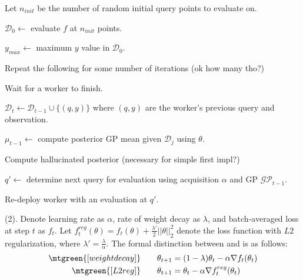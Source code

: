 \documentclass[11pt]{article}
\begin{document}
\begin{algorithm}
	Let $n_{init}$ be the number of random initial query points to evaluate on. 
	
	\begin{compactitem}
		\item $\mathcal{D}_0 \leftarrow$ evaluate $f$ at $n_{init}$ points.
		
		\item $y_{max} \leftarrow$ maximum $y$ value in $\mathcal{D}_0$. 
		
		\item Repeat the following for some number of iterations (ok how many tho?)
		\begin{compactitem}
			\item Wait for a worker to finish. 
			
			\item $\mathcal{D}_t \leftarrow \mathcal{D}_{t-1} \cup \{(q, y)\}$ where $(q, y)$ are the worker's previous query and observation. 
			
			\item $\mu_{t-1} \leftarrow $ compute posterior GP mean given $\mathcal{D}_j$ using $\theta$.  
			
			\item Compute hallucinated posterior (necessary for simple first impl?)
			
			\item $q' \leftarrow$ determine next query for evaluation using acquisition $\alpha$ and GP $\mathcal{GP}_{t-1}$. 
			
			\item Re-deploy worker with an evaluation at $q'$. 
		\end{compactitem}
	\end{compactitem}
\end{algorithm}









 (2). Denote learning rate as $\alpha$, rate of weight decay as $\lambda$, and batch-averaged loss at step $t$ as $f_t$. Let $f_t^{reg}(\theta) = f_t(\theta) + \frac{\lambda'}{2} || \theta||_2^2$ denote the loss function with $L2$ regularization, where $\lambda' = \frac{\lambda}{\alpha}$. The formal distinction between  and  is as follows:
\begin{align}
	\mtgreen{[weight decay]}
	&\qquad \theta_{t+1}
	= (1 - \lambda) \theta_t - \alpha \nabla f_t(\theta_t) \\
	\mtgreen{[L2 reg]}
	&\qquad \theta_{t+1}
	= \theta_t - \alpha \nabla f_t^{reg}(\theta_t)
\end{align}
\end{document}
